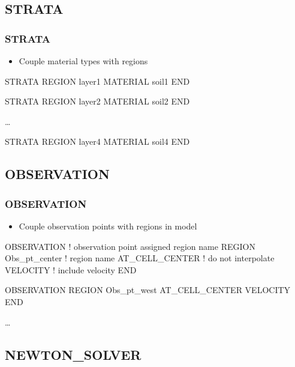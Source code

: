 \documentclass{beamer}
\newcommand\bluecomment[1]{{{\color{blue} #1}}}
\begin{document}
\subsection{STRATA}

\begin{frame}[fragile]\frametitle{\bf STRATA}

\begin{itemize}
\item Couple material types with regions
\end{itemize}

\begin{semiverbatim}
STRATA
  REGION layer1
  MATERIAL soil1
END

STRATA
  REGION layer2
  MATERIAL soil2
END

\ldots

STRATA
  REGION layer4
  MATERIAL soil4
END
\end{semiverbatim}

\end{frame}


\subsection{OBSERVATION}

\begin{frame}[fragile]\frametitle{\bf OBSERVATION}

\begin{itemize}
\item Couple observation points with regions in model
\end{itemize}

\begin{semiverbatim}
OBSERVATION  \bluecomment{! observation point assigned region name}
  REGION Obs_pt_center  \bluecomment{! region name}
  AT_CELL_CENTER        \bluecomment{! do not interpolate}
  VELOCITY              \bluecomment{! include velocity}
END

OBSERVATION
  REGION Obs_pt_west
  AT_CELL_CENTER
  VELOCITY
END

\dots
\end{semiverbatim}

\end{frame}

\subsection{NEWTON\_SOLVER}
\end{document}
